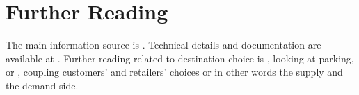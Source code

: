 \section{Further Reading}
The main information source is \citet[][]{Horni_PhDThesis_2013}. Technical details and documentation are available at \citet[][]{MATSIM-T-DC_Webpage_2014}. Further reading related to destination choice is \citet[][]{HorniEtAl_IATBRspec_2013}, looking at parking, or \citet[][]{HorniEtAl_TechRep_IVT_2012}, coupling customers' and retailers' choices or in other words the supply and the demand side.


